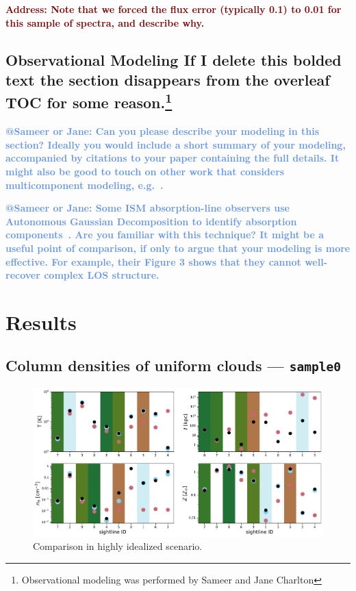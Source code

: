 \documentclass[fleqn,usenatbib]{mnras}
\makeatletter
\newcommand{\todo}[1]{\textcolor{Maroon}{\textbf{Address: #1}}}
\newcommand{\atsameer}[1]{\textcolor{CornflowerBlue}{\textbf{@Sameer or Jane: #1}}}
\makeatother
\begin{document}
\todo{Note that we forced the flux error (typically 0.1) to 0.01 for this sample of spectra, and describe why.}

\subsection[Observational Modeling]{Observational Modeling \textbf{If I delete this bolded text the section disappears from the overleaf TOC for some reason.}\footnote{
Observational modeling was performed by Sameer and Jane Charlton}}
\label{s: observational modeling}

\atsameer{
Can you please describe your modeling in this section?
Ideally you would include a short summary of your modeling, accompanied by citations to your paper containing the full details.
It might also be good to touch on other work that considers multicomponent modeling, e.g.~\cite{Liang2018}.
}

\atsameer{
Some ISM absorption-line observers use Autonomous Gaussian Decomposition to identify absorption components~\citep[e.g.][]{Murray2017}.
Are you familiar with this technique?
It might be a useful point of comparison, if only to argue that your modeling is more effective.
For example, their Figure 3 shows that they cannot well-recover complex LOS structure.
}

\section{Results}
\label{s: results}

\subsection{Column densities of uniform clouds --- \texttt{sample0}}
\label{s: results -- sample0}

\begin{figure}
    \centering
    \includegraphics[width=\textwidth]{figures/sample0/comparison.pdf}
    \caption{
    Comparison in highly idealized scenario.
    }
    \label{f: idealized}
\end{figure}
\end{document}
